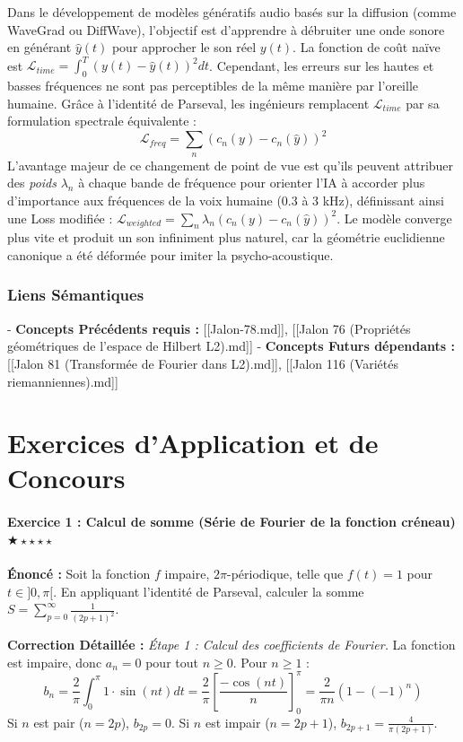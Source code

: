 \documentclass[11pt,a4paper]{article}
\begin{document}
Dans le développement de modèles génératifs audio basés sur la diffusion (comme WaveGrad ou DiffWave), l'objectif est d'apprendre à débruiter une onde sonore en générant $\hat{y}(t)$ pour approcher le son réel $y(t)$.
La fonction de coût naïve est $\mathcal{L}_{time} = \int_0^T (y(t) - \hat{y}(t))^2 dt$.
Cependant, les erreurs sur les hautes et basses fréquences ne sont pas perceptibles de la même manière par l'oreille humaine. Grâce à l'identité de Parseval, les ingénieurs remplacent $\mathcal{L}_{time}$ par sa formulation spectrale équivalente :
$$\mathcal{L}_{freq} = \sum_{n} (c_n(y) - c_n(\hat{y}))^2$$
L'avantage majeur de ce changement de point de vue est qu'ils peuvent attribuer des \textit{poids} $\lambda_n$ à chaque bande de fréquence pour orienter l'IA à accorder plus d'importance aux fréquences de la voix humaine (0.3 à 3 kHz), définissant ainsi une Loss modifiée : $\mathcal{L}_{weighted} = \sum_{n} \lambda_n (c_n(y) - c_n(\hat{y}))^2$. Le modèle converge plus vite et produit un son infiniment plus naturel, car la géométrie euclidienne canonique a été déformée pour imiter la psycho-acoustique.

\section{Liens Sémantiques}

- \textbf{Concepts Précédents requis :} [[Jalon-78.md]], [[Jalon 76 (Propriétés géométriques de l'espace de Hilbert L2).md]]
- \textbf{Concepts Futurs dépendants :} [[Jalon 81 (Transformée de Fourier dans L2).md]], [[Jalon 116 (Variétés riemanniennes).md]]

\newpage
\part{Exercices d'Application et de Concours}
\subsection*{Exercice 1 : Calcul de somme (Série de Fourier de la fonction créneau) $\bigstar\star\star\star\star$}

\textbf{Énoncé :} Soit la fonction $f$ impaire, $2\pi$-périodique, telle que $f(t) = 1$ pour $t \in ]0, \pi[$. En appliquant l'identité de Parseval, calculer la somme $S = \sum_{p=0}^\infty \frac{1}{(2p+1)^2}$.

\textbf{Correction Détaillée :}
\textit{Étape 1 : Calcul des coefficients de Fourier.}
La fonction est impaire, donc $a_n = 0$ pour tout $n \ge 0$.
Pour $n \ge 1$ :
$$b_n = \frac{2}{\pi} \int_0^\pi 1 \cdot \sin(nt) dt = \frac{2}{\pi} \left[ \frac{-\cos(nt)}{n} \right]_0^\pi = \frac{2}{\pi n} (1 - (-1)^n)$$
Si $n$ est pair ($n=2p$), $b_{2p} = 0$.
Si $n$ est impair ($n=2p+1$), $b_{2p+1} = \frac{4}{\pi(2p+1)}$.
\end{document}
